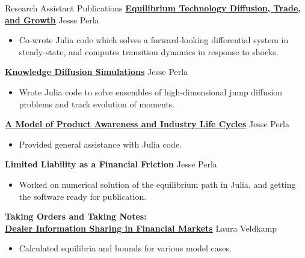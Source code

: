 \documentclass{resume} %
\begin{document}
\begin{rSection}{Research Assistant Publications}
    {\bf \href{https://github.com/jlperla/PerlaTonettiWaugh.jl}{Equilibrium Technology Diffusion, Trade, and Growth}}  \hfill {Jesse Perla}
    \begin{itemize}
        \item Co-wrote Julia code which solves a forward-looking differential system in steady-state, and computes transition dynamics in response to shocks.
    \end{itemize}

    {\bf \href{https://github.com/jlperla/KnowledgeDiffusionSimulations.jl}{Knowledge Diffusion Simulations}} \hfill {Jesse Perla}
    \begin{itemize}
        \item Wrote Julia code to solve ensembles of high-dimensional jump diffusion problems and track evolution of moments.
    \end{itemize}

    {\bf \href{https://github.com/jlperla/Perla1.jl}{A Model of Product Awareness and Industry Life Cycles}} \hfill {Jesse Perla}
    \begin{itemize}
        \item Provided general assistance with Julia code.
    \end{itemize}

    {\bf {Limited Liability as a Financial Friction}} \hfill {Jesse Perla}
    \begin{itemize}
        \item Worked on numerical solution of the equilibrium path in Julia, and getting the software ready for publication.
    \end{itemize}


    {\bf Taking Orders and Taking Notes: \\ \href{https://www.nber.org/papers/w22461}{Dealer Information Sharing in Financial Markets}} \hfill {Laura Veldkamp}
    \begin{itemize}
        \item Calculated equilibria and bounds for various model cases.
    \end{itemize}


\end{rSection}
\end{document}

